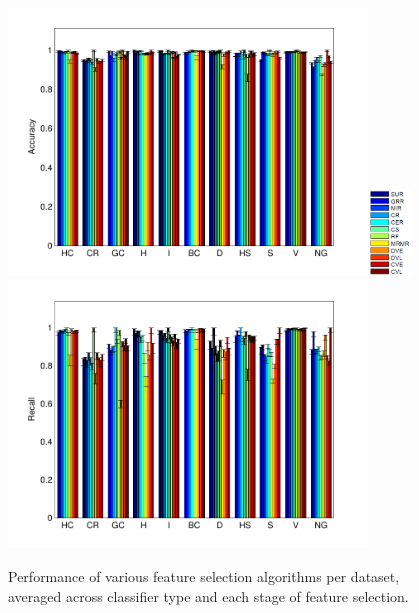 \begin{figure}[tbp!]
\includegraphics[width=0.85\textwidth]{./figures/dataset_perf/Accuracy.pdf}\vspace{-20mm}\includegraphics[width=0.10\textwidth]{./figures/dataset_perf/legend.PNG}\\
\includegraphics[width=0.85\textwidth]{./figures/dataset_perf/Recall.pdf}
\caption{\footnotesize Performance of various feature selection algorithms per dataset, averaged across classifier type and each stage of feature selection.}
\label{fig:perf_vs_dataset}
\end{figure}

